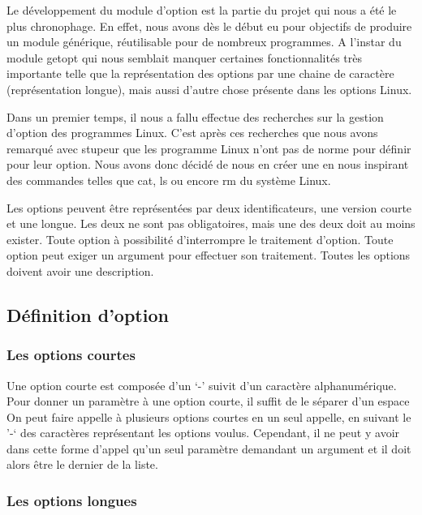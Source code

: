 \documentclass[12pt]{article}
\begin{document}
    Le développement du module d'option est la partie du projet qui nous a été 
    le plus chronophage. En effet, nous avons dès le début eu pour objectifs de 
    produire un module générique, réutilisable pour de nombreux programmes. A 
    l'instar du module getopt qui nous semblait manquer certaines fonctionnalités
    très importante telle que la représentation des options par une chaine de 
    caractère (représentation longue), mais aussi d'autre chose présente dans 
    les options Linux. 

    Dans un premier temps, il nous a fallu effectue des recherches sur la 
    gestion d'option des programmes Linux. C'est après ces recherches que nous 
    avons remarqué avec stupeur que les programme Linux n'ont pas de norme pour 
    définir pour leur option. Nous avons donc décidé de nous en créer une en 
    nous inspirant des commandes telles que cat, ls ou encore rm du système Linux.

    Les options peuvent être représentées par deux identificateurs, une version 
    courte et une longue. Les deux ne sont pas obligatoires, mais une des deux 
    doit au moins exister. Toute option à possibilité d'interrompre le traitement 
    d'option. Toute option peut exiger un argument pour effectuer son 
    traitement. Toutes les options doivent avoir une description. 

    \subsection{Définition d'option}

    \subsubsection{Les options courtes}

    Une option courte est composée d'un `-' suivit d'un caractère 
    alphanumérique. Pour donner un paramètre à une option courte, il suffit de 
    le séparer d'un espace On peut faire appelle à plusieurs options courtes en un 
    seul  appelle, en suivant le '-` des caractères représentant les options 
    voulus. Cependant, il ne peut y avoir dans cette forme d'appel qu'un seul 
    paramètre demandant un argument et il doit alors être le dernier de la 
    liste. 

    \subsubsection{Les options longues}
\end{document}
